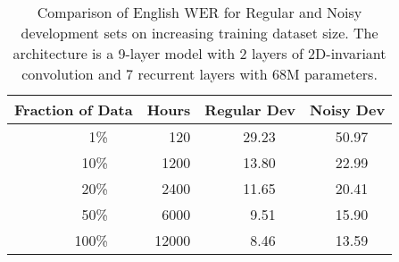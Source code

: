 \begin{table}
\centering
\begin{tabular}{r r r  r  r r r  r r r}
\toprule
\multicolumn{3}{c}{Fraction of Data} & Hours & \multicolumn{3}{c}{Regular Dev} & \multicolumn{3}{c}{Noisy Dev} \\
\midrule
& 1\%   & & 120   & & 29.23 & & & 50.97 & \\
& 10\%  & & 1200  & & 13.80 & & & 22.99 & \\
& 20\%  & & 2400  & & 11.65 & & & 20.41 & \\
& 50\%  & & 6000  & & 9.51  & & & 15.90 & \\
& 100\% & & 12000 & & 8.46  & & & 13.59 & \\
\bottomrule
\end{tabular}
\caption{Comparison of English WER for Regular and Noisy development sets on
         increasing training dataset size. The architecture is a 9-layer model with
         2 layers of 2D-invariant convolution and 7 recurrent layers with 68M
         parameters.}
\label{table:scaling_asr:datascale}
\end{table}

